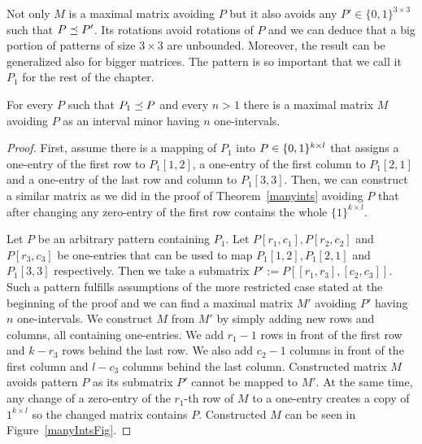 Not only $M$ is a maximal matrix avoiding $P$ but it also avoids any $P'\in\{0,1\}^{3\times3}$ such that $P\preceq P'$. Its rotations avoid rotations of $P$ and we can deduce that a big portion of patterns of size $3\times3$ are unbounded. Moreover, the result can be generalized also for bigger matrices. The pattern is so important that we call it $P_1$ for the rest of the chapter.

\begin{thm}
For every $P$ such that $P_1\preceq P$ and every $n>1$ there is a maximal matrix $M$ avoiding $P$ as an interval minor having $n$ one-intervals.
\end{thm}
\begin{proof}
First, assume there is a mapping of $P_1$ into $P\in\{0,1\}^{k\times l}$ that assigns a one-entry of the first row to $P_1[1,2]$, a one-entry of the first column to $P_1[2,1]$ and a one-entry of the last row and column to $P_1[3,3]$. Then, we can construct a similar matrix as we did in the proof of Theorem~\ref{manyints} avoiding $P$ that after changing any zero-entry of the first row contains the whole $\{1\}^{k\times l}$.

Let $P$ be an arbitrary pattern containing $P_1$. Let $P[r_1,c_1],P[r_2,c_2]$ and $P[r_3,c_3]$ be one-entries that can be used to map $P_1[1,2],P_1[2,1]$ and $P_1[3,3]$ respectively. Then we take a submatrix $P':=P[[r_1,r_3],[c_2,c_3]]$. Such a pattern fulfills assumptions of the more restricted case stated at the beginning of the proof and we can find a maximal matrix $M'$ avoiding $P'$ having $n$ one-intervals. We construct $M$ from $M'$ by simply adding new rows and columns, all containing one-entries. We add $r_1-1$ rows in front of the first row and $k-r_3$ rows behind the last row. We also add $c_2-1$ columns in front of the first column and $l-c_3$ columns behind the last column. Constructed matrix $M$ avoids pattern $P$ as its submatrix $P'$ cannot be mapped to $M'$. At the same time, any change of a zero-entry of the $r_1$-th row of $M$ to a one-entry creates a copy of ${1}^{k\times l}$ so the changed matrix contains $P$. Constructed $M$ can be seen in Figure~\ref{manyIntsFig}.


\end{proof}
